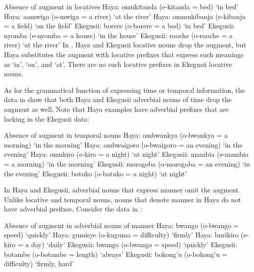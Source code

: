 \documentclass[output=paper]{langscibook}
\begin{document}
\ea Absence of augment in locatives\smallskip
\label{hayagusii14}
  \ea\label{hayagusii14a} 	Haya:\hphantom{isit} 		omukitanda (e-kitanda = bed)\hphantom{neld}		‘in bed’
  \ex\label{hayagusii14b} 	Haya:\hphantom{isit} 		aamwiga (o-mwiga = a river)\hphantom{nield}	 	‘at the river’
  \ex\label{hayagusii14c} 	Haya:\hphantom{isit} 		ommukibanja (e-kibanja = a field) 	‘on the field’
  \ex\label{hayagusii14d} 	Ekegusii: 	borere (o-borere = a bed)\hphantom{i= a field}		‘in bed’
  \ex\label{hayagusii14e} 	Ekegusii: 	nyomba (e-nyomba = a house)\hphantom{itld}	 ‘in the house’
  \ex\label{hayagusii14f} 	Ekegusii: 	rooche (o-rooche = a river)\hphantom{ia field} 		‘at the river’
  \z
\z
In , Haya and Ekegusii locative nouns drop the augment, but Haya substitutes the augment with locative prefixes that express such meanings as ‘in’, ‘on’, and ‘at’. There are no such locative prefixes in Ekegusii locative nouns.

As for the grammatical function of expressing time or temporal information, the data in  show that both Haya and Ekegusii adverbial nouns of time drop the augment as well. Note that Haya examples have adverbial prefixes that are lacking in the Ekegusii data:

\ea Absence of augment in temporal nouns\smallskip
\label{hayagusii15}
  \ea\label{hayagusii15a}	 Haya:\hphantom{isit} 		ombwankya (o-bwankya = a morning)\hphantom{g} 	‘in the morning’
  \ex\label{hayagusii15b} 	Haya:\hphantom{isit} 		ombwaigoro (o-bwaigoro = an evening)	‘in the evening’
  \ex\label{hayagusii15c} 	Haya:\hphantom{isit}		omukiro (e-kiro = a night)\hphantom{t= an evening}			‘at night’
  \ex\label{hayagusii15d} 	Ekegusii: 	mambia (e-mambia = a morning)\hphantom{vening}		‘in the morning’
  \ex\label{hayagusii15e} 	Ekegusii: 	morogoba (o-morogoba = an evening)\hphantom{ig}	‘in the evening’
  \ex\label{hayagusii15f} 	Ekegusii: 	botuko (o-botuko = a night)\hphantom{tan evening} 			‘at night’
  \z
\z

In Haya and Ekegusii, adverbial nouns that express manner omit the augment. Unlike locative and temporal nouns, nouns that denote manner in Haya do not have adverbial prefixes. Consider the data in :

\ea Absence of augment in adverbial nouns of manner\smallskip
\label{hayagusii16}
  \ea\label{hayagusii16a} 	Haya:\hphantom{isit} 		bwango (o-bwango = speed)\hphantom{ftculty}		‘quickly’
  \ex\label{hayagusii16b} 	Haya:\hphantom{isit} 		gumisye (o-kuguma = difficulty)\hphantom{iy)}	 ‘firmly’
  \ex\label{hayagusii16c} 	Haya:\hphantom{isit} 		burikiro (e-kiro = a day)\hphantom{a difficulty}		‘daily’
  \ex\label{hayagusii16d} 	Ekegusii:  	bwango (o-bwango = speed)\hphantom{iiculty}		‘quickly’
  \ex\label{hayagusii16e} 	Ekegusii: 	botambe (o-botambe = length)\hphantom{utty} 	‘always’
  \ex\label{hayagusii16f} 	Ekegusii: 	bokong’u (o-bokong’u = difficulty) 	‘firmly, hard’
  \z
\z
\end{document}
